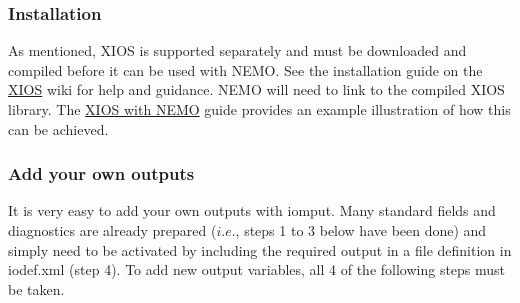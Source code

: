 \documentclass[../tex_main/NEMO_manual]{subfiles}
\begin{document}
\subsubsection{Installation}

As mentioned, XIOS is supported separately and must be downloaded and compiled before it can be used with NEMO.
See the installation guide on the \href{http://forge.ipsl.jussieu.fr/ioserver/wiki}{XIOS} wiki for help and guidance.
NEMO will need to link to the compiled XIOS library.
The \href{https://forge.ipsl.jussieu.fr/nemo/wiki/Users/ModelInterfacing/InputsOutputs#Inputs-OutputsusingXIOS}
{XIOS with NEMO} guide provides an example illustration of how this can be achieved.

\subsubsection{Add your own outputs}

It is very easy to add your own outputs with iomput.
Many standard fields and diagnostics are already prepared ($i.e.$, steps 1 to 3 below have been done) and
simply need to be activated by including the required output in a file definition in iodef.xml (step 4).
To add new output variables, all 4 of the following steps must be taken.
\end{document}
